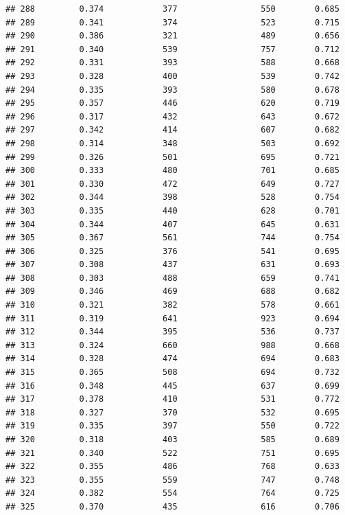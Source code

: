 \documentclass[]{book}
\begin{document}
\begin{verbatim}
## 288         0.374            377                 550        0.685
## 289         0.341            374                 523        0.715
## 290         0.386            321                 489        0.656
## 291         0.340            539                 757        0.712
## 292         0.331            393                 588        0.668
## 293         0.328            400                 539        0.742
## 294         0.335            393                 580        0.678
## 295         0.357            446                 620        0.719
## 296         0.317            432                 643        0.672
## 297         0.342            414                 607        0.682
## 298         0.314            348                 503        0.692
## 299         0.326            501                 695        0.721
## 300         0.333            480                 701        0.685
## 301         0.330            472                 649        0.727
## 302         0.344            398                 528        0.754
## 303         0.335            440                 628        0.701
## 304         0.344            407                 645        0.631
## 305         0.367            561                 744        0.754
## 306         0.325            376                 541        0.695
## 307         0.308            437                 631        0.693
## 308         0.303            488                 659        0.741
## 309         0.346            469                 688        0.682
## 310         0.321            382                 578        0.661
## 311         0.319            641                 923        0.694
## 312         0.344            395                 536        0.737
## 313         0.324            660                 988        0.668
## 314         0.328            474                 694        0.683
## 315         0.365            508                 694        0.732
## 316         0.348            445                 637        0.699
## 317         0.378            410                 531        0.772
## 318         0.327            370                 532        0.695
## 319         0.335            397                 550        0.722
## 320         0.318            403                 585        0.689
## 321         0.340            522                 751        0.695
## 322         0.355            486                 768        0.633
## 323         0.355            559                 747        0.748
## 324         0.382            554                 764        0.725
## 325         0.370            435                 616        0.706

\end{verbatim}
\end{document}
